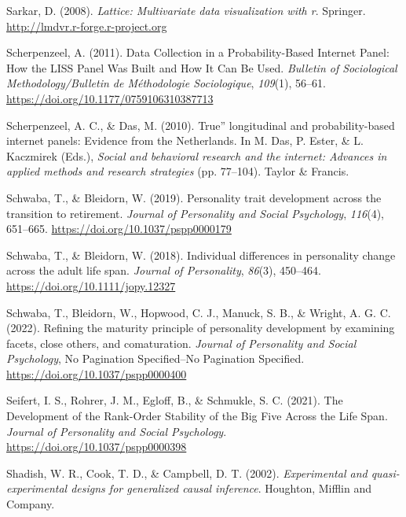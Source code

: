 \documentclass[
  english,
  man,floatsintext]{apa7}
\begin{document}
\leavevmode\hypertarget{ref-R-lattice}{}%
Sarkar, D. (2008). \emph{Lattice: Multivariate data visualization with r}. Springer. \url{http://lmdvr.r-forge.r-project.org}

\leavevmode\hypertarget{ref-scherpenzeelDataCollectionProbabilityBased2011}{}%
Scherpenzeel, A. (2011). Data Collection in a Probability-Based Internet Panel: How the LISS Panel Was Built and How It Can Be Used. \emph{Bulletin of Sociological Methodology/Bulletin de Méthodologie Sociologique}, \emph{109}(1), 56--61. \url{https://doi.org/10.1177/0759106310387713}

\leavevmode\hypertarget{ref-scherpenzeelTrueLongitudinalProbabilitybased2010}{}%
Scherpenzeel, A. C., \& Das, M. (2010). True'' longitudinal and probability-based internet panels: Evidence from the Netherlands. In M. Das, P. Ester, \& L. Kaczmirek (Eds.), \emph{Social and behavioral research and the internet: Advances in applied methods and research strategies} (pp. 77--104). Taylor \& Francis.

\leavevmode\hypertarget{ref-schwabaPersonalityTraitDevelopment2019}{}%
Schwaba, T., \& Bleidorn, W. (2019). Personality trait development across the transition to retirement. \emph{Journal of Personality and Social Psychology}, \emph{116}(4), 651--665. \url{https://doi.org/10.1037/pspp0000179}

\leavevmode\hypertarget{ref-schwabaIndividualDifferencesPersonality2018}{}%
Schwaba, T., \& Bleidorn, W. (2018). Individual differences in personality change across the adult life span. \emph{Journal of Personality}, \emph{86}(3), 450--464. \url{https://doi.org/10.1111/jopy.12327}

\leavevmode\hypertarget{ref-schwabaRefiningMaturityPrinciple2022}{}%
Schwaba, T., Bleidorn, W., Hopwood, C. J., Manuck, S. B., \& Wright, A. G. C. (2022). Refining the maturity principle of personality development by examining facets, close others, and comaturation. \emph{Journal of Personality and Social Psychology}, No Pagination Specified--No Pagination Specified. \url{https://doi.org/10.1037/pspp0000400}

\leavevmode\hypertarget{ref-seifertDevelopmentRankOrderStability2021}{}%
Seifert, I. S., Rohrer, J. M., Egloff, B., \& Schmukle, S. C. (2021). The Development of the Rank-Order Stability of the Big Five Across the Life Span. \emph{Journal of Personality and Social Psychology}. \url{https://doi.org/10.1037/pspp0000398}

\leavevmode\hypertarget{ref-shadishExperimentalQuasiexperimentalDesigns2002}{}%
Shadish, W. R., Cook, T. D., \& Campbell, D. T. (2002). \emph{Experimental and quasi-experimental designs for generalized causal inference}. Houghton, Mifflin and Company.
\end{document}
